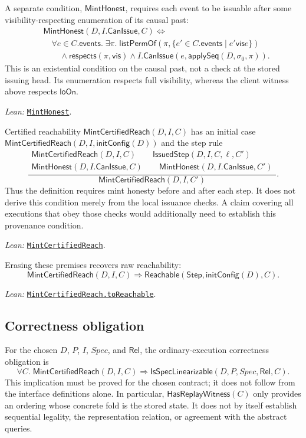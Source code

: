 \documentclass[11pt]{article}
\theoremstyle{definition}
\newcommand{\init}{\sigma_0}
\newcommand{\applySeq}{\mathsf{applySeq}}
\newcommand{\vis}{\mathrel{\mathsf{vis}}}
\newcommand{\loOn}{\mathsf{loOn}}
\newcommand{\src}[2]{\href{../../#1}{\texttt{#2}}}
\newcommand{\anchor}[2]{\par\smallskip\noindent\emph{Lean: }\src{#1}{#2}.}
\begin{document}
A separate condition, $\mathsf{MintHonest}$, requires each event to be
issuable after some visibility-respecting enumeration of its causal past:
\[
\begin{aligned}
 &\mathsf{MintHonest}(D,I.\mathsf{CanIssue},C)\Longleftrightarrow\\
 &\quad\forall e\in C.\mathsf{events}.\;\exists\pi.\;
 \mathsf{listPermOf}(\pi,\{e'\in C.\mathsf{events}\mid e'\vis e\})\\
 &\qquad\land\mathsf{respects}(\pi,\vis)
 \land I.\mathsf{CanIssue}(e,\applySeq(D,\init,\pi)).
\end{aligned}
\]
This is an existential condition on the causal past, not a check at the
stored issuing head. Its enumeration respects full visibility, whereas
the client witness above respects $\loOn$.
\anchor{Sal/MRDTs/Framework/Certificates.lean}{MintHonest}

Certified reachability $\mathsf{MintCertifiedReach}(D,I,C)$ has an initial
case $\mathsf{MintCertifiedReach}(D,I,\mathsf{initConfig}(D))$ and the step rule
\[
\frac{
 \begin{gathered}
 \mathsf{MintCertifiedReach}(D,I,C)\qquad
 \mathsf{IssuedStep}(D,I,C,\ell,C')\\
 \mathsf{MintHonest}(D,I.\mathsf{CanIssue},C)\qquad
 \mathsf{MintHonest}(D,I.\mathsf{CanIssue},C')
 \end{gathered}
}{
 \mathsf{MintCertifiedReach}(D,I,C')
}.
\]
Thus the definition requires mint honesty before and after each step.
It does not derive this condition merely from the local issuance checks.
A claim covering all executions that obey those checks would additionally
need to establish this provenance condition.
\anchor{Sal/MRDTs/Framework/Certificates.lean}{MintCertifiedReach}

Erasing these premises recovers raw reachability:
\[
 \mathsf{MintCertifiedReach}(D,I,C)
 \Longrightarrow
 \mathsf{Reachable}(\mathsf{Step},\mathsf{initConfig}(D),C).
\]
\anchor{Sal/MRDTs/Framework/Certificates.lean}
  {MintCertifiedReach.toReachable}

\subsection{Correctness obligation}

For the chosen $D$, $P$, $I$, $\mathit{Spec}$, and $\mathsf{Rel}$, the
ordinary-execution correctness obligation is
\[
 \forall C.\;
 \mathsf{MintCertifiedReach}(D,I,C)
 \Longrightarrow
 \mathsf{IsSpecLinearizable}(D,P,\mathit{Spec},\mathsf{Rel},C).
\]
This implication must be proved for the chosen contract; it does not follow
from the interface definitions alone. In particular,
$\mathsf{HasReplayWitness}(C)$ only provides an ordering whose concrete fold
is the stored state. It does not by itself establish sequential legality,
the representation relation, or agreement with the abstract queries.
\end{document}
